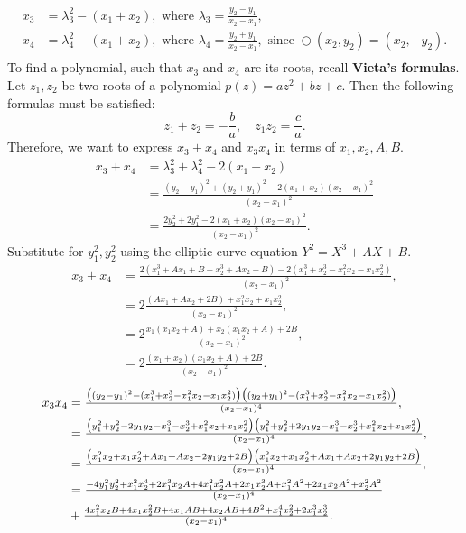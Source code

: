 \documentclass[thesis=M,english]{FITthesis}[2012/10/20]
\theoremstyle{remark}
\theoremstyle{definition}
\begin{document}
\begin{align*}
x_3 &= \lambda_3^2 - (x_1 + x_2), \text{ where } \lambda_3 = \frac{y_2 - y_1}{x_2 - x_1},\\ 
x_4 &= \lambda_4^2 - (x_1 + x_2), \text{ where } \lambda_4 = \frac{y_2 + y_1}{x_2 - x_1}, \text{ since } \ominus (x_2,y_2) = (x_2, -y_2).\\ 
\end{align*}
To find a polynomial, such that $x_3$ and $x_4$ are its roots, recall \textbf{Vieta's formulas}. Let $z_1, z_2$ be two roots of a polynomial $p(z) = az^2 + bz + c$. Then the following formulas must be satisfied:
$$
z_1 + z_2 = -\frac{b}{a},\quad z_1z_2 = \frac{c}{a}.
$$
Therefore, we want to express $x_3 + x_4$ and $x_3 x_4$ in terms of $x_1,x_2,A,B$.
\begin{align*}
x_3 + x_4 &= \lambda_3^2 + \lambda_4^2 - 2(x_1+x_2) \\
&= \frac{(y_2-y_1)^2 + (y_2+y_1)^2 -2(x_1+x_2)(x_2-x_1)^2}{(x_2-x_1)^2} \\
&= \frac{2y_2^2+2y_1^2 -2(x_1+x_2)(x_2-x_1)^2}{(x_2-x_1)^2}.
\end{align*}
Substitute for $y_1^2,y_2^2$ using the elliptic curve equation $Y^2 = X^3 + AX + B.$
 \begin{align*}
x_3 + x_4 &= \frac{2(x_1^3+Ax_1+B+x_2^3+Ax_2+B) -2(x_1^3+x_2^3-x_1^2x_2-x_1x_2^2)}{(x_2-x_1)^2},\\
&= 2\frac{(Ax_1+Ax_2+2B) +x_1^2x_2+x_1x_2^2}{(x_2-x_1)^2}, \\
&= 2\frac{x_1(x_1x_2 + A) + x_2(x_1x_2 + A)+2B}{(x_2-x_1)^2},\\ 
&= 2\frac{(x_1 + x_2)(x_1x_2 + A)+2B}{(x_2-x_1)^2}.
\end{align*}
\vphantom{.}
\begin{align*}
\mathsmaller{x_3x_4} &= \mathsmaller{\frac{\big((y_2-y_1)^2 -(x_1^3+x_2^3-x_1^2x_2-x_1x_2^2)\big)\big((y_2+y_1)^2-(x_1^3+x_2^3-x_1^2x_2-x_1x_2^2)\big)}{(x_2-x_1)^4}}, \\
&= \mathsmaller{\frac{\big(y_1^2 + y_2^2 -2y_1y_2 -x_1^3-x_2^3+x_1^2x_2+x_1x_2^2\big)\big(y_1^2 + y_2^2 +2y_1y_2 -x_1^3-x_2^3+x_1^2x_2+x_1x_2^2\big)}{(x_2-x_1)^4}},\\
&= \mathsmaller{\frac{\big(x_1^2x_2 + x_1x_2^2 + Ax_1 + Ax_2 - 2y_1y_2 + 2B\big)\big(x_1^2x_2 + x_1x_2^2 + Ax_1 + Ax_2 + 2y_1y_2 + 2B\big)}{(x_2-x_1)^4}},\\
&= \mathsmaller{\frac{- 4 y_{1}^{2} y_{2}^{2} + x_{1}^{2} x_{2}^{4} + 2 x_{1}^{3} x_{2} A + 4 x_{1}^{2} x_{2}^{2} A + 2 x_{1} x_{2}^{3} A + x_{1}^{2} A^{2} + 2 x_{1} x_{2} A^{2} + x_{2}^{2} A^{2}}{(x_2-x_1)^4}} \\
&+\mathsmaller{ \frac{4 x_{1}^{2} x_{2} B + 4 x_{1} x_{2}^{2} B + 4 x_{1} A B + 4 x_{2} A B + 4 B^{2} + x_{1}^{4} x_{2}^{2} + 2 x_{1}^{3} x_{2}^{3}}{(x_2-x_1)^4}}.
\end{align*}
\end{document}
